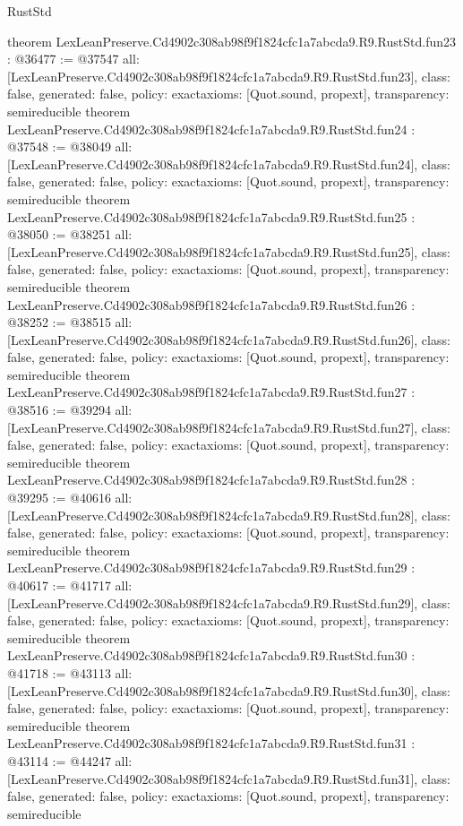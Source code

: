 \begin{lexlean}{RustStd}
\begin{coremodule}
{}
theorem LexLeanPreserve.Cd4902c308ab98f9f1824cfc1a7abcda9.R9.RustStd.fun23 : @36477 := @37547 {
  all: [LexLeanPreserve.Cd4902c308ab98f9f1824cfc1a7abcda9.R9.RustStd.fun23],
  class: false,
  generated: false,
  policy: exact{axioms: [Quot.sound, propext]},
  transparency: semireducible
}
theorem LexLeanPreserve.Cd4902c308ab98f9f1824cfc1a7abcda9.R9.RustStd.fun24 : @37548 := @38049 {
  all: [LexLeanPreserve.Cd4902c308ab98f9f1824cfc1a7abcda9.R9.RustStd.fun24],
  class: false,
  generated: false,
  policy: exact{axioms: [Quot.sound, propext]},
  transparency: semireducible
}
theorem LexLeanPreserve.Cd4902c308ab98f9f1824cfc1a7abcda9.R9.RustStd.fun25 : @38050 := @38251 {
  all: [LexLeanPreserve.Cd4902c308ab98f9f1824cfc1a7abcda9.R9.RustStd.fun25],
  class: false,
  generated: false,
  policy: exact{axioms: [Quot.sound, propext]},
  transparency: semireducible
}
theorem LexLeanPreserve.Cd4902c308ab98f9f1824cfc1a7abcda9.R9.RustStd.fun26 : @38252 := @38515 {
  all: [LexLeanPreserve.Cd4902c308ab98f9f1824cfc1a7abcda9.R9.RustStd.fun26],
  class: false,
  generated: false,
  policy: exact{axioms: [Quot.sound, propext]},
  transparency: semireducible
}
theorem LexLeanPreserve.Cd4902c308ab98f9f1824cfc1a7abcda9.R9.RustStd.fun27 : @38516 := @39294 {
  all: [LexLeanPreserve.Cd4902c308ab98f9f1824cfc1a7abcda9.R9.RustStd.fun27],
  class: false,
  generated: false,
  policy: exact{axioms: [Quot.sound, propext]},
  transparency: semireducible
}
theorem LexLeanPreserve.Cd4902c308ab98f9f1824cfc1a7abcda9.R9.RustStd.fun28 : @39295 := @40616 {
  all: [LexLeanPreserve.Cd4902c308ab98f9f1824cfc1a7abcda9.R9.RustStd.fun28],
  class: false,
  generated: false,
  policy: exact{axioms: [Quot.sound, propext]},
  transparency: semireducible
}
theorem LexLeanPreserve.Cd4902c308ab98f9f1824cfc1a7abcda9.R9.RustStd.fun29 : @40617 := @41717 {
  all: [LexLeanPreserve.Cd4902c308ab98f9f1824cfc1a7abcda9.R9.RustStd.fun29],
  class: false,
  generated: false,
  policy: exact{axioms: [Quot.sound, propext]},
  transparency: semireducible
}
theorem LexLeanPreserve.Cd4902c308ab98f9f1824cfc1a7abcda9.R9.RustStd.fun30 : @41718 := @43113 {
  all: [LexLeanPreserve.Cd4902c308ab98f9f1824cfc1a7abcda9.R9.RustStd.fun30],
  class: false,
  generated: false,
  policy: exact{axioms: [Quot.sound, propext]},
  transparency: semireducible
}
theorem LexLeanPreserve.Cd4902c308ab98f9f1824cfc1a7abcda9.R9.RustStd.fun31 : @43114 := @44247 {
  all: [LexLeanPreserve.Cd4902c308ab98f9f1824cfc1a7abcda9.R9.RustStd.fun31],
  class: false,
  generated: false,
  policy: exact{axioms: [Quot.sound, propext]},
  transparency: semireducible
}
\end{coremodule}
\end{lexlean}
